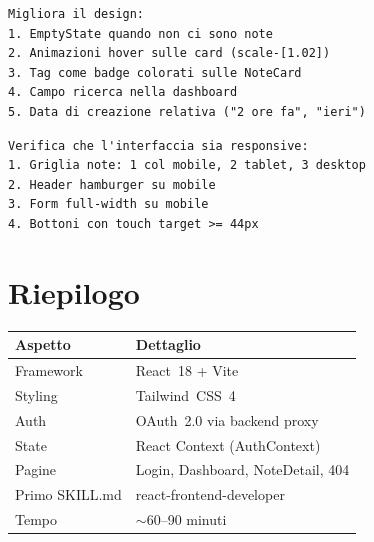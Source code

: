 \begin{praticabox}[title={Pratica --- Migliorare l'aspetto}]
\begin{lstlisting}[language={}]
Migliora il design:
1. EmptyState quando non ci sono note
2. Animazioni hover sulle card (scale-[1.02])
3. Tag come badge colorati sulle NoteCard
4. Campo ricerca nella dashboard
5. Data di creazione relativa ("2 ore fa", "ieri")
\end{lstlisting}
\end{praticabox}

\begin{praticabox}[title={Pratica --- Responsive design}]
\begin{lstlisting}[language={}]
Verifica che l'interfaccia sia responsive:
1. Griglia note: 1 col mobile, 2 tablet, 3 desktop
2. Header hamburger su mobile
3. Form full-width su mobile
4. Bottoni con touch target >= 44px
\end{lstlisting}
\end{praticabox}

\section*{Riepilogo}

\begin{center}
\begin{tabularx}{\textwidth}{l X}
\toprule
\textbf{Aspetto} & \textbf{Dettaglio} \\
\midrule
Framework & React~18 + Vite \\
Styling & Tailwind~CSS~4 \\
Auth & OAuth~2.0 via backend proxy \\
State & React Context (AuthContext) \\
Pagine & Login, Dashboard, NoteDetail, 404 \\
Primo SKILL.md & react-frontend-developer \\
Tempo & $\sim$60--90 minuti \\
\bottomrule
\end{tabularx}
\end{center}
